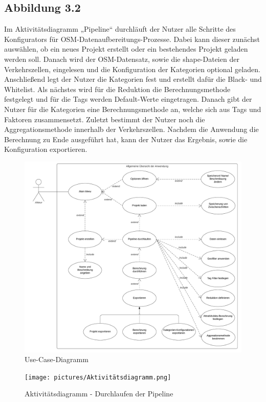 \documentclass[parskip=full]{scrartcl} %
\begin{document}
\subsection*{Abbildung 3.2}
Im Aktivitätsdiagramm „Pipeline“ durchläuft der Nutzer alle Schritte des Konfigurators für OSM-Datenaufbereitungs-Prozesse. Dabei kann dieser zunächst auswählen, ob ein neues Projekt erstellt oder ein bestehendes Projekt geladen werden soll. Danach wird der OSM-Datensatz, sowie die shape-Dateien der Verkehrszellen, eingelesen und die Konfiguration der Kategorien optional geladen. Anschließend legt der Nutzer die Kategorien fest und erstellt dafür die Black- und Whitelist. Als nächstes wird für die Reduktion die Berechnungsmethode festgelegt und für die Tags werden Default-Werte eingetragen. Danach gibt der Nutzer für die Kategorien eine Berechnungsmethode an, welche sich aus Tags und Faktoren zusammensetzt. Zuletzt bestimmt der Nutzer noch die Aggregationsmethode innerhalb der Verkehrszellen. Nachdem die Anwendung die Berechnung zu Ende ausgeführt hat, kann der Nutzer das Ergebnis, sowie die Konfiguration exportieren. 
\begin{figure}
    \centering
    \includegraphics[width=1\textwidth]{pictures/Anwendungsfalldiagramm.png}
    \caption{Use-Case-Diagramm}
\end{figure}

\begin{figure}
    \centering
    \texttt{[image: pictures/Aktivitätsdiagramm.png]}
    \caption{Aktivitätsdiagramm - Durchlaufen der Pipeline}
\end{figure}
\end{document}
